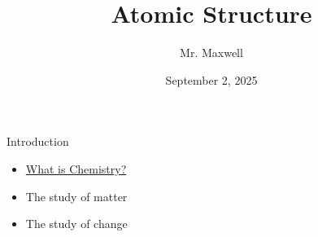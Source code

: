 \documentclass[presentation]{beamer}
\author{Mr. Maxwell}
\date{September 2, 2025}
\title{Atomic Structure}
\begin{document}
\maketitle


\begin{frame}[label={sec:org5ffaa91}]{Introduction}
\begin{itemize}
\item \href{https://www.youtube.com/watch?v=NDPad7BIQpU\&pp=ygUeYnJlYWtpbmcgYmFkIHdoYXQgaXMgY2hlbWlzdHJ5}{What is Chemistry?}
\end{itemize}
\pause
\begin{itemize}
\item The study of matter
\end{itemize}
\pause
\begin{itemize}
\item The study of change
\end{itemize}

\begin{block}{}
\end{block}
\end{frame}
\end{document}
